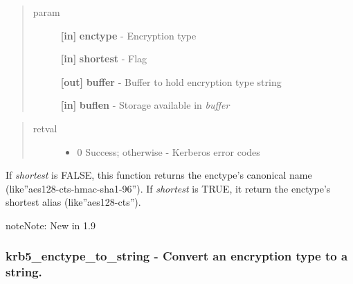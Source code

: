 \documentclass[letterpaper,10pt,english]{sphinxmanual}
\begin{document}
\begin{quote}\begin{description}
\item[{param}] \leavevmode
\textbf{{[}in{]}} \textbf{enctype} - Encryption type

\textbf{{[}in{]}} \textbf{shortest} - Flag

\textbf{{[}out{]}} \textbf{buffer} - Buffer to hold encryption type string

\textbf{{[}in{]}} \textbf{buflen} - Storage available in \emph{buffer}

\end{description}\end{quote}
\begin{quote}\begin{description}
\item[{retval}] \leavevmode\begin{itemize}
\item {} 
0   Success; otherwise - Kerberos error codes

\end{itemize}

\end{description}\end{quote}

If \emph{shortest} is FALSE, this function returns the enctype's canonical name (like''aes128-cts-hmac-sha1-96''). If \emph{shortest} is TRUE, it return the enctype's shortest alias (like''aes128-cts'').

\begin{notice}{note}{Note:}
New in 1.9
\end{notice}


\subsubsection{krb5\_enctype\_to\_string -  Convert an encryption type to a string.}
\label{appdev/refs/api/krb5_enctype_to_string::doc}\label{appdev/refs/api/krb5_enctype_to_string:krb5-enctype-to-string-convert-an-encryption-type-to-a-string}

\begin{fulllineitems}
\label{appdev/refs/api/krb5_enctype_to_string:krb5_enctype_to_string}
\end{fulllineitems}
\end{document}
